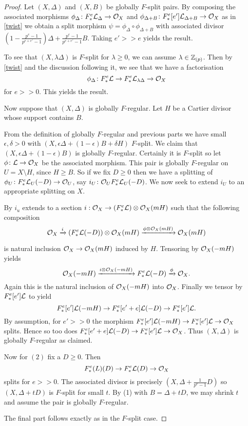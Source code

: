 \begin{proof}
	Let $(X,\Delta)$ and $(X,B)$ be globally $F$-split pairs. By composing the associated morphisms $\phi_{\Delta} \colon \Fe \mathcal{L}_{\Delta} \to \ox$ and $\phi_{\Delta+B} \colon \Fe[e'] \mathcal{L}_{\Delta+B} \to \ox$ as in \autoref{twist} we obtain a split morphism $\psi=\phi_{\Delta}\circ \phi_{\Delta+B}$ with associated divisor $(1-\frac{p^{e}-1}{p^{e+e'}-1})\Delta+ \frac{p^{e}-1}{p^{e+e'}-1}B$. Taking $e'>>e$ yields the result. 
	
	To see that $(X,\lambda \Delta)$ is $F$-split for $\lambda \geq 0$, we can assume $\lambda \in \zp$. Then by \autoref{twist} and the discussion following it, we see that we have a factorisation $$\phi_{\Delta} \colon \Fe \mathcal{L} \to \Fe \mathcal{L}_{\lambda \Delta} \to \ox$$ for $e>>0$. This yields the result.
	
	Now suppose that $(X,\Delta)$ is globally $F$-regular. Let $H$ be a Cartier divisor whose support contains $B$. 
	
	From the definition of globally $F$-regular and previous parts we have small $\epsilon, \delta > 0$ with $(X,\epsilon \Delta +(1-\epsilon)B+\delta H)$ $F$-split. We claim that $(X,\epsilon \Delta +(1-\epsilon)B)$ is globally $F$-regular. Certainly it is $F$-split so let $\phi\colon \mathcal{L} \to \ox$ be the associated morphism. This pair is globally $F$-regular on $U=X\setminus H$, since $H \geq B$. So if we fix $D\geq 0$ then we have a splitting of $\phi_{U}\colon \Fe \mathcal{L}_{U}(-D) \to \ox[U]$, say $i_{U}\colon \ox[U] \Fe \mathcal{L}_{U}(-D)$. We now seek to extend $i_{U}$ to an appropriate splitting on $X$.
	
	By \cite[Chapter II, Lemma 5.14(b)]{Ha77} $i_{u}$ extends to a section $i:\ox \to (\Fe \mathcal{L}) \otimes \ox(mH)$ such that the following composition 
	\[\ox \xrightarrow{i} (\Fe \mathcal{L}(-D)) \otimes \ox(mH) \xrightarrow{\phi\otimes\ox(mH)} \ox(mH)\]
	
	is natural inclusion $\ox \to \ox(mH)$ induced by $H$. Tensoring by $\ox(-mH)$ yields
	\[\ox(-mH) \xrightarrow{i\otimes \ox(-mH)} \Fe \mathcal{L}(-D) \xrightarrow{\phi} \ox.\]
	Again this is the natural inclusion of $\ox(-mH)$ into $\ox$. Finally we tensor by $\Fe[e']\mathcal{L}$ to yield
	$$\Fe[e']\mathcal{L}(-mH) \to \Fe[e'+e]\mathcal{L}(-D) \to \Fe[e']\mathcal{L}.$$
	By assumption, for $e'>>0$ the morphism $\Fe[e']\mathcal{L}(-mH) \to  \Fe[e']\mathcal{L} \to \ox$ splits. Hence so too does $\Fe[e'+e]\mathcal{L}(-D) \to \Fe[e']\mathcal{L} \to \ox$. Thus $(X,\Delta)$ is globally $F$-regular as claimed.
		
	Now for $(2)$ fix a $D \geq 0$. Then $$\Fe \mathcal(L)(D) \to \Fe \mathcal{L}(D) \to \ox $$ splits for $e>>0$. The associated divisor is precisely $(X,\Delta+\frac{1}{p^{e}-1}D)$ so $(X,\Delta+tD)$ is $F$-split for small $t$. By (1) with $B=\Delta+tD$, we may shrink $t$ and assume the pair is globally $F$-regular. 
	
	The final part follows exactly as in the $F$-split case.
	
\end{proof}

